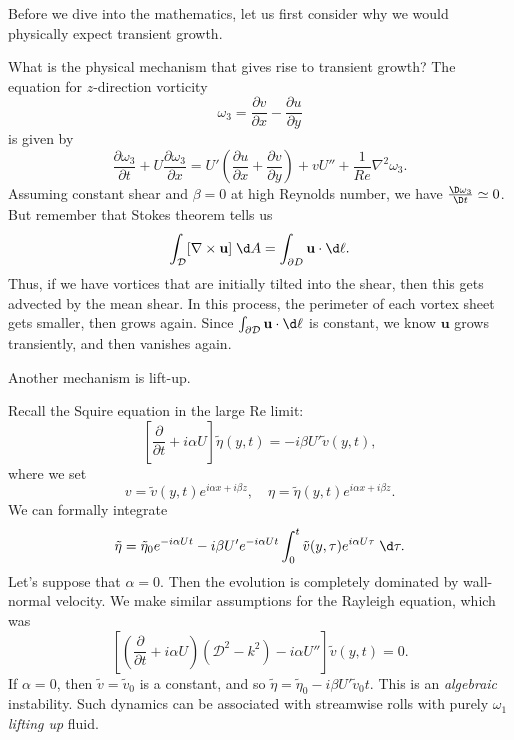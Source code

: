 \documentclass[a4paper]{article}
\begin{document}
Before we dive into the mathematics, let us first consider why we would physically expect transient growth.

What is the physical mechanism that gives rise to transient growth? The equation for $z$-direction vorticity
\[
  \omega_3 = \frac{\partial v}{\partial x} - \frac{\partial u}{\partial y}
\]
is given by
\[
  \frac{\partial \omega_3}{\partial t} + U \frac{\partial \omega_3}{\partial x} = U' \left(\frac{\partial u}{\partial x} + \frac{\partial v}{\partial y}\right) + v U'' + \frac{1}{Re} \nabla^2 \omega_3.
\]
Assuming constant shear and $\beta = 0$ at high Reynolds number, we have $\frac{\D \omega_3}{\D t} \simeq 0$. But remember that Stokes theorem tells us
\[
  \int_\mathcal{D} [\nabla \times \mathbf{u}] \;\d A = \int_{\partial D} \mathbf{u} \cdot \d \ell.
\]
Thus, if we have vortices that are initially tilted into the shear, then this gets advected by the mean shear. In this process, the perimeter of each vortex sheet gets smaller, then grows again. Since $\int_{\partial \mathcal{D}} \mathbf{u} \cdot \d \ell$ is constant, we know $\mathbf{u}$ grows transiently, and then vanishes again.

Another mechanism is lift-up.

Recall the Squire equation in the large Re limit:
\[
  \left[\frac{\partial}{\partial t} + i \alpha U \right] \tilde{\eta}(y, t) = -i \beta U' \tilde{v}(y, t),
\]
where we set
\[
  v = \tilde{v}(y, t) e^{i\alpha x + i \beta z},\quad \eta = \tilde{\eta}(y, t) e^{i\alpha x + i \beta z}.
\]
We can formally integrate
\[
  \tilde{\eta} = \tilde{\eta}_0 e^{-i\alpha Ut} - i \beta U' e^{-i\alpha Ut} \int_0^t \tilde{v}(y, \tau)e^{i \alpha U\tau} \;\d \tau.
\]
Let's suppose that $\alpha = 0$. Then the evolution is completely dominated by wall-normal velocity. We make similar assumptions for the Rayleigh equation, which was
\[
  \left[\left(\frac{\partial}{\partial t} + i \alpha U\right) (\mathcal{D}^2 - k^2) - i \alpha U''\right] \tilde{v}(y, t) = 0.
\]
If $\alpha = 0$, then $\tilde{v} = \tilde{v}_0$ is a constant, and so $\tilde{\eta} = \tilde{\eta}_0 - i \beta U' \tilde{v}_0 t$. This is an \emph{algebraic} instability. Such dynamics can be associated with streamwise rolls with purely $\omega_1$ \emph{lifting up} fluid.
\end{document}
